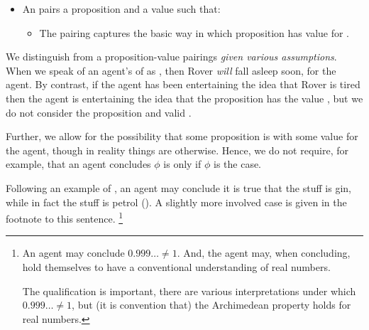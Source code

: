 \begin{note}
  \begin{specification}[\evalN{3}]
    \begin{itemize}
    \item
      An \emph{\evalN{}} pairs a proposition and a value such that:
      \begin{itemize}
      \item
        The pairing captures the basic way in which proposition has value for \vAgent{}.
      \end{itemize}
    \end{itemize}
    \vspace{-\baselineskip}
  \end{specification}

  We distinguish \evalN{} from a proposition-value pairings \emph{given various assumptions}.
  When we speak of an agent's \evalN{} of  as , then Rover \emph{will} fall asleep soon, for the agent.
  By contrast, if the agent has been entertaining the idea that Rover is tired then the agent is entertaining the idea that the proposition  has the value , but we do not consider the proposition and valid .

  Further, we allow for the possibility that some proposition is  with some value for the agent, though in reality things are otherwise.
  Hence, we do not require, for example, that an agent concludes \(\phi\) is  only if \(\phi\) is the case.

  Following an example of \citeauthor{Williams:1979wi}, an agent may conclude it is true that the stuff is gin, while in fact the stuff is petrol (\citeyear[18]{Williams:1979wi}).
  A slightly more involved case is given in the footnote to this sentence.%
  \footnote{
    An agent may conclude \(0.999\dots \ne 1\).
    And, the agent may, when concluding, hold themselves to have a conventional understanding of real numbers.

    The qualification is important, there are various interpretations under which \(0.999\dots \ne 1\), but (it is convention that) the Archimedean property holds for real numbers.

}
\end{note}
